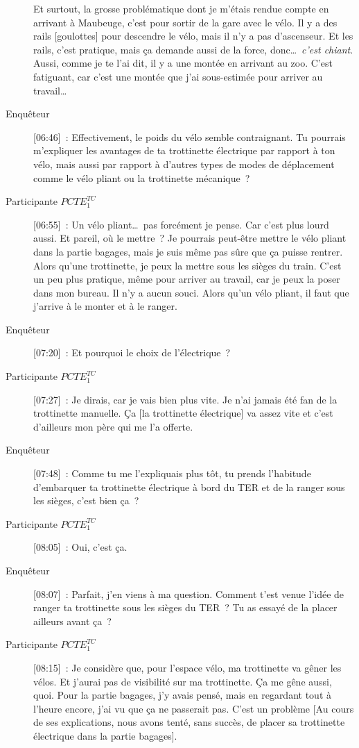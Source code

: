 \begin{description}
    Et surtout, la grosse problématique dont je m’étais rendue compte en arrivant à Maubeuge, c’est pour sortir de la gare avec le vélo. Il y a des rails [goulottes] pour descendre le vélo, mais il n’y a pas d’ascenseur. Et les rails, c’est pratique, mais ça demande aussi de la force, donc\dots~\textsl{c’est chiant}. Aussi, comme je te l’ai dit, il y a une montée en arrivant au zoo. C’est fatiguant, car c’est une montée que j’ai sous-estimée pour arriver au travail\dots
    \item[Enquêteur] [06:46]~: Effectivement, le poids du vélo semble contraignant. Tu pourrais m'expliquer les avantages de ta trottinette électrique par rapport à ton vélo, mais aussi par rapport à d'autres types de modes de déplacement comme le vélo pliant ou la trottinette mécanique~?
    \item[Participante \(PCTE^{TC}_{1}\)] [06:55]~: Un vélo pliant\dots~pas forcément je pense. Car c’est plus lourd aussi. Et pareil, où le mettre~? Je pourrais peut-être mettre le vélo pliant dans la partie bagages, mais je suis même pas sûre que ça puisse rentrer. Alors qu’une trottinette, je peux la mettre sous les sièges du train. C’est un peu plus pratique, même pour arriver au travail, car je peux la poser dans mon bureau. Il n’y a aucun souci. Alors qu’un vélo pliant, il faut que j’arrive à le monter et à le ranger.
    \item[Enquêteur] [07:20]~: Et pourquoi le choix de l'électrique~?
    \item[Participante \(PCTE^{TC}_{1}\)] [07:27]~: Je dirais, car je vais bien plus vite. Je n’ai jamais été fan de la trottinette manuelle. Ça [la trottinette électrique] va assez vite et c’est d’ailleurs mon père qui me l’a offerte.
    \item[Enquêteur] [07:48]~: Comme tu me l’expliquais plus tôt, tu prends l’habitude d’embarquer ta trottinette électrique à bord du TER et de la ranger sous les sièges, c'est bien ça~?
    \item[Participante \(PCTE^{TC}_{1}\)] [08:05]~: Oui, c'est ça.
    \item[Enquêteur] [08:07]~: Parfait, j'en viens à ma question. Comment t'est venue l'idée de ranger ta trottinette sous les sièges du TER~? Tu as essayé de la placer ailleurs avant ça~?
    \item[Participante \(PCTE^{TC}_{1}\)] [08:15]~: Je considère que, pour l’espace vélo, ma trottinette va gêner les vélos. Et j'aurai pas de visibilité sur ma trottinette. Ça me gêne aussi, quoi. Pour la partie bagages, j’y avais pensé, mais en regardant tout à l’heure encore, j’ai vu que ça ne passerait pas. C’est un problème [Au cours de ses explications, nous avons tenté, sans succès, de placer sa trottinette électrique dans la partie bagages].%
    

\end{description}
